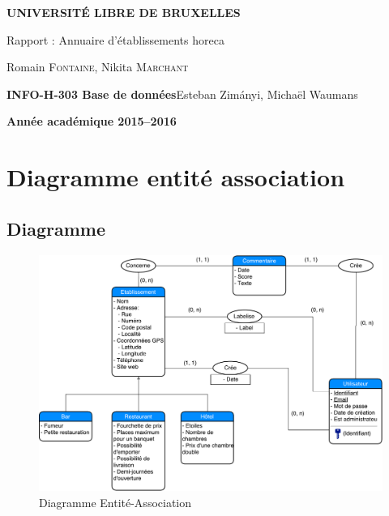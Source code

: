 \documentclass[10pt,a4paper]{article}
\begin{document}
\begin{titlepage}
    \begin{center}
        \textbf{\textsc{UNIVERSIT\'E LIBRE DE BRUXELLES}}\\
        \vfill{}\vfill{}
        \begin{center}{\Huge Rapport : Annuaire d’établissements horeca}\end{center}{\Huge \par}
        \begin{center}{\large Romain \textsc{Fontaine}, Nikita \textsc{Marchant}}\end{center}{\Huge \par}
        \vfill{}\vfill{} \vfill{}
        \begin{flushleft}{\large \textbf{INFO-H-303 Base de données}}\hfill{Esteban Zimányi, Michaël Waumans}\end{flushleft}{\large\par}
        \vfill{}\vfill{}\enlargethispage{3cm}
        \textbf{Année académique 2015--2016}
    \end{center}
\end{titlepage}

\setlength{\parindent}{1.5em}
\setlength{\parskip}{1em}
\linespread{1.1}

\section{Diagramme entité association}
\subsection{Diagramme}
\begin{figure}[h]
    \includegraphics[scale=0.40]{EA.pdf}
    \caption{Diagramme Entité-Association}
    \label{diagram}
\end{figure}
\FloatBarrier
\end{document}
